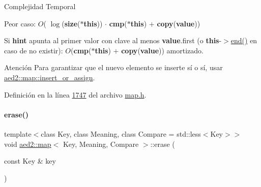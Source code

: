 \begin{DoxyDescription}
\item[Complejidad Temporal]
\begin{DoxyItemize}
\item Peor caso\+: $O$( $\log$({\bfseries size}({\bfseries $\ast$this})) $\cdot$ {\bfseries cmp}({\bfseries $\ast$this}) $+$ {\bfseries copy}({\bfseries value}))
\item Si {\bfseries hint} apunta al primer valor con clave al menos {\bfseries value}.first (o {\bfseries this}-\/$>$\hyperlink{classaed2_1_1map_a76023e6a56cb625513e1b5ea028bf983_a76023e6a56cb625513e1b5ea028bf983}{end()} en caso de no existir)\+: $O$({\bfseries cmp}({\bfseries $\ast$this}) $+$ {\bfseries copy}({\bfseries value})) amortizado. 
\end{DoxyItemize}
\end{DoxyDescription}

\begin{DoxyAttention}{Atención}
Para garantizar que el nuevo elemento se inserte sí o sí, usar \hyperlink{classaed2_1_1map_a2ef6723c183916276b0afc4a4c721475_a2ef6723c183916276b0afc4a4c721475}{aed2\+::map\+::insert\+\_\+or\+\_\+assign}. 
\end{DoxyAttention}


Definición en la línea \hyperlink{map_8h_source_l01747}{1747} del archivo \hyperlink{map_8h_source}{map.\+h}.

\mbox{\label{classaed2_1_1map_a2ffadb42cd5f0bc7b3752ff159b75334_a2ffadb42cd5f0bc7b3752ff159b75334}} 
\paragraph{\texorpdfstring{erase()}{erase()}\hspace{0.1cm}{\footnotesize\ttfamily [2/2]}}
{\footnotesize\ttfamily template$<$class Key, class Meaning, class Compare = std\+::less$<$\+Key$>$$>$ \\
void \hyperlink{classaed2_1_1map}{aed2\+::map}$<$ Key, Meaning, Compare $>$\+::erase (\begin{DoxyParamCaption}\item[{const Key \&}]{key }\end{DoxyParamCaption})\hspace{0.3cm}{\ttfamily [inline]}}



